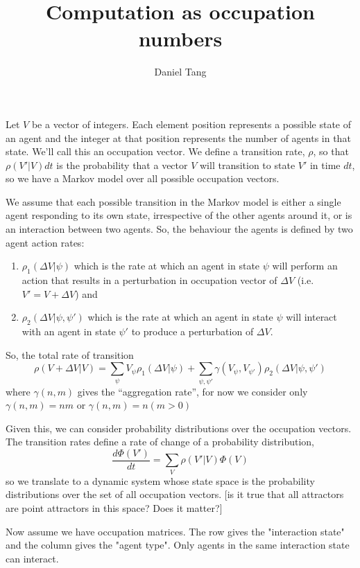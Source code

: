 \documentclass[a4paper]{article}
\title{Computation as occupation numbers}
\author{Daniel Tang}
\begin{document}
\maketitle

Let $V$ be a vector of integers. Each element position represents a possible state of an agent and the integer at that position represents the number of agents in that state. We'll call this an occupation vector. We define a transition rate, $\rho$, so that $\rho(V'|V)dt$ is the probability that a vector $V$ will transition to state $V'$ in time $dt$, so we have a Markov model over all possible occupation vectors.

We assume that each possible transition in the Markov model is either a single agent responding to its own state, irrespective of the other agents around it, or is an interaction between two agents. So, the behaviour the agents is defined by two agent action rates:
\begin{enumerate}
	\item $\rho_1(\Delta V|\psi)$ which is the rate at which an agent in state $\psi$ will perform an action that results in a perturbation in occupation vector of $\Delta V$ (i.e. $V' = V + \Delta V$) and
	\item $\rho_2(\Delta V|\psi,\psi')$ which is the rate at which an agent in state $\psi$ will interact with an agent in state $\psi'$ to produce a perturbation of $\Delta V$. 
\end{enumerate}

So, the total rate of transition 
\[
\rho(V + \Delta V|V) = \sum_{\psi} V_\psi \rho_1(\Delta V|\psi) + \sum_{\psi,\psi'} \gamma(V_{\psi},V_{\psi'}) \rho_2(\Delta V|\psi,\psi')
\]
where $\gamma(n,m)$ gives the ``aggregation rate'', for now we consider only $\gamma(n,m) = nm$ or $\gamma(n,m) = n(m>0)$

Given this, we can consider probability distributions over the occupation vectors. The transition rates define a rate of change of a probability distribution,
\[
\frac{d\Phi(V')}{dt} = \sum_{V} \rho(V'|V)\Phi(V) 
\]
so we translate to a dynamic system whose state space is the probability distributions over the set of all occupation vectors. [is it true that all attractors are point attractors in this space? Does it matter?]


Now assume we have occupation matrices. The row gives the "interaction state" and the column gives the "agent type". Only agents in the same interaction state can interact.





\end{document}
